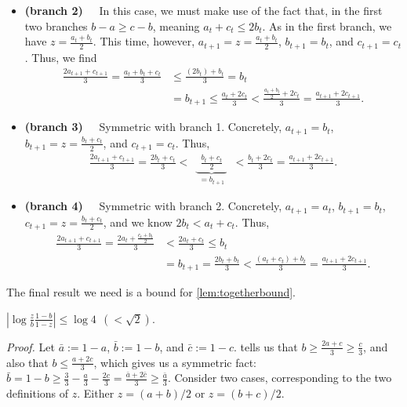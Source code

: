 \begin{lproof}
\begin{itemize}
        \item \textbf{(branch 2)~~}
        In this case, we must make use of the fact that, in the first
        two branches  $b-a \ge c-b$, meaning $a_t + c_t \le 2b_t$.
        As in the first branch, we have $z = \frac{a_t + b_t}{2}$.
        This time, however,
            $a_{t+1} = z = \frac{a_t + b_t}{2}$,
            $b_{t+1} = b_t$, and
            $c_{t+1} = c_t$.
        Thus, we find
        \begin{align*}
            \frac{2 a_{t+1} + c_{t+1}}{3}
            = \frac{a_t + b_t + c_t}{3}
            &\le \frac{(2b_t) + b_t}{3}
            = b_t \\
            &= b_{t+1}
            \le \frac{a_t + 2 c_{t}}{3}
            < \frac{\frac{a_t + b_t}2 + 2 c_{t}}{3}
            = \frac{a_{t+1} + 2 c_{t+1}}{3} .
        \end{align*}

        \item \textbf{(branch 3)~~} Symmetric with branch 1.
        Concretely,
            $a_{t+1} = b_t$,
            $b_{t+1} = z = \frac{b_t + c_t}2$, and
            $c_{t+1} = c_t$. Thus,
        \begin{align*}
            \frac{2 a_{t+1} + c_{t+1}}{3}
            = \frac{2 b_t + c_t}{3} <
            ~~\underbrace{~~\frac{b_t+c_t}{2}~~}_{\textstyle = b_{t+1}}~~
            < \frac{b_t + 2 c_{t}}{3} =
            \frac{a_{t+1} + 2 c_{t+1}}{3}.
        \end{align*}

        \item  \textbf{(branch 4)~~} Symmetric with branch 2.
        Concretely,
            $a_{t+1} = a_t$,
            $b_{t+1} = b_t$,
            $c_{t+1} = z = \frac{b_t+ c_t}2$,
        and we know $2 b_t < a_t + c_t$.
        Thus,
        \begin{align*}
            \frac{2 a_{t+1} + c_{t+1}}{3}
            = \frac{2 a_{t} + \frac{c_{t} + b_t}2}{3}
            &< \frac{2 a_t + c_t}{3}
            \le b_t \\
            &= b_{t+1}
            = \frac{2 b_t + b_t}{3}
            < \frac{(a_t + c_t) + b_t}3
            = \frac{a_{t+1} + 2 c_{t+1}}3
            .
        \end{align*}
    \end{itemize}

    The final result we need is a bound for \cref{lem:togetherbound}. 
    
    \begin{iclaim}\label{claim:logbz-bound}
        $| \log \frac{z}{b} \frac{1-b}{1-z} | \le \log 4
            ~~(< \sqrt{2})$.
    \end{iclaim}
    \textit{Proof.}
    Let $\bar a := 1-a$, $\bar b := 1-b$, and $\bar c := 1-c$. 
     tells us that
    $ b \ge \frac{2a + c}3 \ge \frac c3$, and also that $b \le \frac{a+2c}3$,
    which gives us a symmetric fact:
    $
        \bar b = 1-b \ge \frac33 - \frac a3 - \frac{2c}3 = \frac{\bar a + 2 \bar c}{3} \ge \frac{\bar a}3.
    $
    Consider two cases, corresponding to the two definitions of $z$. 
    Either $z = (a+b)/2$ or $z = (b+c)/2$.
    

\end{lproof}
